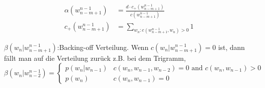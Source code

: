\begin{align}
\alpha (w_{n-m+1}^{n-1}) &=\frac{d\cdot c_{+}(w_{n-m+1}^{n-1})}{c(w_{n-m+1}^{n-1})}\\
c_{+}(w_{n-m+1}^{n-1}) &=\sum_{w_{n}:c(w_{n-m+1}^{n-1},w_{n})>0}1
\end{align}


$\beta (w_{n}|w_{n-m+1}^{n-1})$:Backing-off Verteilung. Wenn $c(w_{n}|w_{n-m+1}^{n-1})=0$ ist, dann f\"allt man auf die Verteilung zur\"uck
z.B. bei dem Trigramm,\\

\begin{equation}
\beta (w_{n}|w_{n-2}^{n-1})=\begin{cases}
p(w_{n}|w_{n-1}) & c(w_{n},w_{n-1},w_{n-2})=0 \text{ and } c(w_{n},w_{n-1})>0 \\
p(w_{n}) & c(w_{n},w_{n-1})=0 
\end{cases}
\end{equation}

